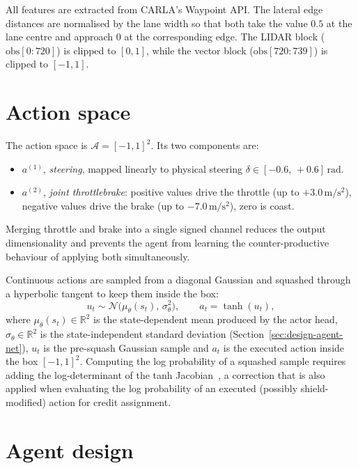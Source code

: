 All features are extracted from CARLA's Waypoint API. The lateral edge distances are normalised
by the lane width so that both take the value \(0.5\) at the lane centre and approach \(0\) at
the corresponding edge. The LIDAR block (\(\text{obs}[0{:}720]\)) is clipped to \([0,1]\), while the
vector block (\(\text{obs}[720{:}739]\)) is clipped to \([-1,1]\).

\section{Action space}\label{sec:design-action}

The action space is \(\mathcal{A} = [-1, 1]^2\). Its two components are:
\begin{itemize}
  \item \(a^{(1)}\), \emph{steering}, mapped linearly to physical steering
        \(\delta \in [-0.6,\, +0.6]\,\mathrm{rad}\).
  \item \(a^{(2)}\), \emph{joint throttle\textendash brake}: positive values drive
        the throttle (up to \(+3.0\,\mathrm{m/s^2}\)), negative values drive the brake (up to
        \(-7.0\,\mathrm{m/s^2}\)), zero is coast.
\end{itemize}

Merging throttle and brake into a single signed channel reduces the output dimensionality and
prevents the agent from learning the counter-productive behaviour of applying both simultaneously.

Continuous actions are sampled from a diagonal Gaussian and squashed through a hyperbolic
tangent to keep them inside the box:
\begin{equation}
  u_t \sim \mathcal{N}\!\big(\mu_\theta(s_t),\, \sigma_\theta^2\big),
  \qquad
  a_t = \tanh(u_t),
  \label{eq:policy-squash}
\end{equation}
where \(\mu_\theta(s_t)\in\mathbb{R}^2\) is the state-dependent mean produced by the actor head,
\(\sigma_\theta\in\mathbb{R}^2\) is the state-independent standard deviation
(Section~\ref{sec:design-agent-net}), \(u_t\) is the pre-squash Gaussian sample and \(a_t\) is the
executed action inside the box \([-1,1]^2\). Computing the log probability of a squashed sample
requires adding the log-determinant of the tanh Jacobian~\cite{haarnoja2018sac}, a correction that
is also applied when evaluating the log probability of an executed (possibly shield-modified)
action for credit assignment.

\section{Agent design}\label{sec:design-agent}

